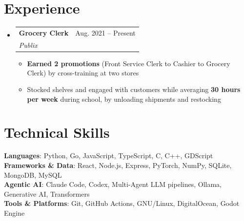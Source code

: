 \documentclass[letterpaper,11pt]{article}
\makeatletter
\newcommand{\resumeItem}[1]{
  \item\small{
    {#1\vspace{-2pt}}
  }
}
\newcommand{\resumeSubheading}[4]{
  \vspace{-2pt}\item
    \begin{tabular*}{0.97\textwidth}[t]{l@{\extracolsep{\fill}}r}
      \textbf{#1} & #2 \\
      \textit{\small#3} & \textit{\small #4} \\
    \end{tabular*}\vspace{-7pt}
}
\newcommand{\resumeSubHeadingListStart}{\begin{itemize}[leftmargin=0.15in, label={}]}
\newcommand{\resumeSubHeadingListEnd}{\end{itemize}}
\newcommand{\resumeItemListStart}{\begin{itemize}}
\newcommand{\resumeItemListEnd}{\end{itemize}\vspace{-5pt}}
\makeatother
\begin{document}
\section{Experience}
  \resumeSubHeadingListStart
    \resumeSubheading
      {Grocery Clerk}{Aug. 2021 -- Present}
      {Publix}{}
      \resumeItemListStart
        \resumeItem{\textbf{Earned 2 promotions} (Front Service Clerk to Cashier to Grocery Clerk) by cross-training at two stores}
        \resumeItem{Stocked shelves and engaged with customers while averaging \textbf{30 hours per week} during school, by unloading shipments and restocking}
      \resumeItemListEnd
  \resumeSubHeadingListEnd

\section{Technical Skills}
 \begin{itemize}[leftmargin=0.15in, label={}]
    \small{\item{
     \textbf{Languages}{: Python, Go, JavaScript, TypeScript, C, C++, GDScript} \\
     \textbf{Frameworks \& Data}{: React, Node.js, Express, PyTorch, NumPy, SQLite, MongoDB, MySQL} \\
     \textbf{Agentic AI}{: Claude Code, Codex, Multi-Agent LLM pipelines, Ollama, Generative AI, Transformers} \\
     \textbf{Tools \& Platforms}{: Git, GitHub Actions, GNU/Linux, DigitalOcean, Godot Engine}
    }}
 \end{itemize}
\end{document}
